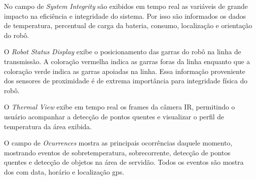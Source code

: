 No campo de \textit{System Integrity} são exibidos em tempo real as variáveis de grande impacto na eficiência e integridade do sistema. Por isso são informados os dados de temperatura, percentual de carga da bateria, consumo, localização e orientação do robô.

O \textit{Robot Status Display} exibe o posicionamento das garras do robô na linha de transmissão. A coloração vermelha indica as garras foras da linha enquanto que a coloração verde indica as garras apoiadas na linha. Essa informação proveniente dos sensores de proximidade é de extrema importância para integridade física do robô.

O \textit{Thermal View} exibe em  tempo real os frames da câmera IR, permitindo o usuário acompanhar a detecção de pontos quentes e visualizar o perfil de temperatura da área exibida. 

O campo de \textit{Ocurrences} mostra as principais ocorrências daquele momento, mostrando eventos de sobretemperatura, sobrecorrente, detecção de pontos quentes e detecção de objetos na área de servidão. Todos os eventos são mostra
dos com data, horário e localização gps. 


